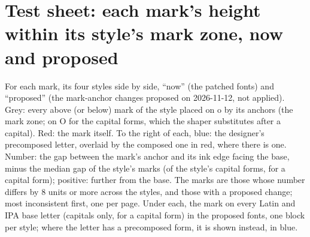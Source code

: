 \documentclass[10pt]{article}
\begin{document}
\section*{Test sheet: each mark's height within its style's mark zone, now and proposed}
For each mark, its four styles side by side, ``now'' (the patched fonts) and ``proposed'' (the mark-anchor changes proposed on 2026-11-12, not applied).
{\color{zone}Grey}: every above (or below) mark of the style placed on o by its anchors (the mark zone; on O for the capital forms, which the shaper substitutes after a capital).
{\color{mk}Red}: the mark itself. To the right of each, {\color{pre}blue}: the designer's precomposed letter, overlaid by the composed one in red, where there is one.
Number: the gap between the mark's anchor and its ink edge facing the base, minus the median gap of the style's marks (of the style's capital forms, for a capital form); positive: further from the base.
The marks are those whose number differs by 8 units or more across the styles, and those with a proposed change; most inconsistent first, one per page.
Under each, the mark on every Latin and IPA base letter (capitals only, for a capital form) in the proposed fonts, one block per style; where the letter has a precomposed form, it is shown instead, in {\color{pre}blue}.
\end{document}

